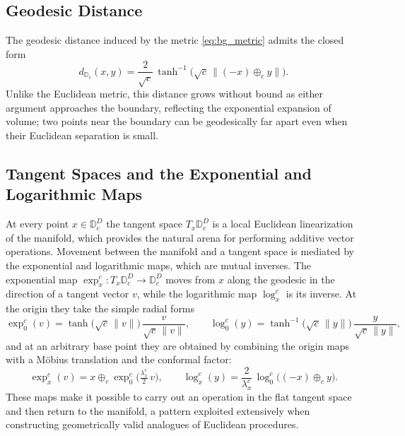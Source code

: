 \documentclass[12pt]{report}
\begin{document}
\subsection{Geodesic Distance}
The geodesic distance induced by the metric \ref{eq:bg_metric} admits the closed form
\begin{equation}
    \label{eq:bg_distance}
    d_{\mathbb{D}_c}(x, y) = \frac{2}{\sqrt{c}}\,\tanh^{-1}\!\Big(\sqrt{c}\,\big\|(-x) \oplus_c y\big\|\Big).
\end{equation}
Unlike the Euclidean metric, this distance grows without bound as either argument approaches the boundary, reflecting the exponential expansion of volume; two points near the boundary can be geodesically far apart even when their Euclidean separation is small.

\subsection{Tangent Spaces and the Exponential and Logarithmic Maps}
At every point $x \in \mathbb{D}_c^D$ the tangent space $T_x\mathbb{D}_c^D$ is a local Euclidean linearization of the manifold, which provides the natural arena for performing additive vector operations. Movement between the manifold and a tangent space is mediated by the exponential and logarithmic maps, which are mutual inverses. The exponential map $\exp_x^c : T_x\mathbb{D}_c^D \to \mathbb{D}_c^D$ moves from $x$ along the geodesic in the direction of a tangent vector $v$, while the logarithmic map $\log_x^c$ is its inverse. At the origin they take the simple radial forms
\begin{equation}
    \label{eq:bg_expmap0}
    \exp_0^c(v) = \tanh\!\big(\sqrt{c}\,\|v\|\big)\,\frac{v}{\sqrt{c}\,\|v\|},
    \qquad
    \log_0^c(y) = \tanh^{-1}\!\big(\sqrt{c}\,\|y\|\big)\,\frac{y}{\sqrt{c}\,\|y\|},
\end{equation}
and at an arbitrary base point they are obtained by combining the origin maps with a M\"obius translation and the conformal factor:
\begin{equation}
    \label{eq:bg_expmap}
    \exp_x^c(v) = x \oplus_c \exp_0^c\!\Big(\tfrac{\lambda_x^c}{2}\, v\Big),
    \qquad
    \log_x^c(y) = \frac{2}{\lambda_x^c}\,\log_0^c\!\big((-x) \oplus_c y\big).
\end{equation}
These maps make it possible to carry out an operation in the flat tangent space and then return to the manifold, a pattern exploited extensively when constructing geometrically valid analogues of Euclidean procedures.
\end{document}

